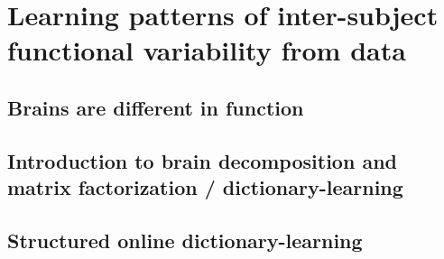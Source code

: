 
\chapter{Learning patterns of inter-subject functional variability from data}
\section{Brains are different in function}
\section{Introduction to brain decomposition and matrix factorization / dictionary-learning}
\section{Structured online dictionary-learning}







